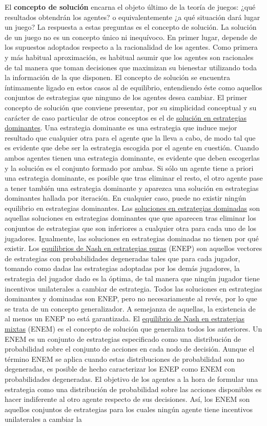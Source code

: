 \documentclass{nuevotema}
\begin{document}
El \textbf{concepto de solución} encarna el objeto último de la teoría de juegos: ¿qué resultados obtendrán los agentes? o equivalentemente ¿a qué situación dará lugar un juego? La respuesta a estas preguntas es el concepto de solución. La solución de un juego no es un concepto único ni inequívoco. En primer lugar, depende de los supuestos adoptados respecto a la racionalidad de los agentes. Como primera y más habitual aproximación, es habitual asumir que los agentes son racionales de tal manera que toman decisiones que maximizan su bienestar utilizando toda la información de la que disponen. El concepto de solución se encuentra íntimamente ligado en estos casos al de equilibrio, entendiendo éste como aquellos conjuntos de estrategias que ninguno de los agentes desea cambiar. El primer concepto de solución que conviene presentar, por su simplicidad conceptual y su carácter de caso particular de otros conceptos es el de \underline{solución en estrategias dominantes}. Una estrategia dominante es una estrategia que induce mejor resultado que cualquier otra para el agente que la lleva a cabo, de modo tal que es evidente que debe ser la estrategia escogida por el agente en cuestión. Cuando ambos agentes tienen una estrategia dominante, es evidente que deben escogerlas y la solución es el conjunto formado por ambas. Si sólo un agente tiene a priori una estrategia dominante, es posible que tras eliminar el resto, el otro agente pase a tener también una estrategia dominante y aparezca una solución en estrategias dominantes hallada por iteración. En cualquier caso, puede no existir ningún equilibrio en estrategias dominantes. Las \underline{soluciones en estrategias dominadas} son aquellas soluciones en estrategias dominantes que que aparecen tras eliminar los conjuntos de estrategias que son inferiores a cualquier otra para cada uno de los jugadores. Igualmente, las soluciones en estrategias dominadas no tienen por qué existir. Los \underline{equilibrios de Nash en estrategias puras} (ENEP) son aquellos vectores de estrategias con probabilidades degeneradas tales que para cada jugador, tomando como dadas las estrategias adoptadas por los demás jugadores, la estrategia del jugador dado es la óptima, de tal manera que ningún jugador tiene incentivos unilaterales a cambiar de estrategia. Todos las soluciones en estrategias dominantes y dominadas son ENEP, pero no necesariamente al revés, por lo que se trata de un concepto generalizador. A semejanza de aquellas, la existencia de al menos un ENEP no está garantizada. El \underline{equilibrio de Nash en estrategias mixtas} (ENEM) es el concepto de solución que generaliza todos los anteriores. Un ENEM es un conjunto de estrategias especificado como una distribución de probabilidad sobre el conjunto de acciones en cada nodo de decisión. Aunque el término ENEM se aplica cuando estas distribuciones de probabilidad son no degeneradas, es posible de hecho caracterizar los ENEP como ENEM con probabilidades degeneradas. El objetivo de los agentes a la hora de formular una estrategia como una distribución de probabilidad sobre las acciones disponibles es hacer indiferente al otro agente respecto de sus decisiones. Así, los ENEM son aquellos conjuntos de estrategias para los cuales ningún agente tiene incentivos unilaterales a cambiar la 
\end{document}
